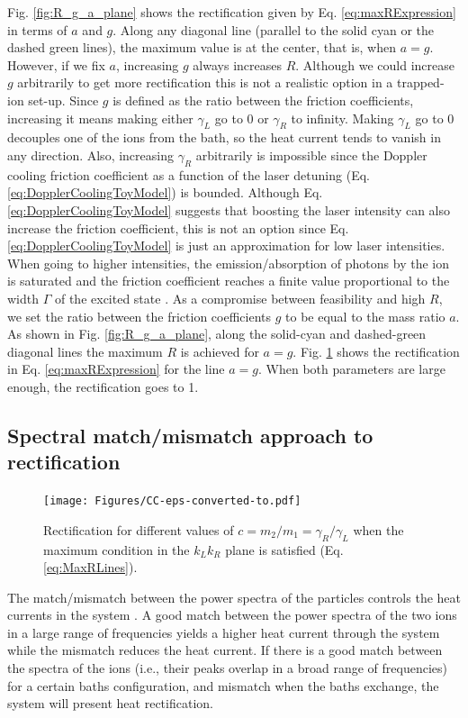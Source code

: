 Fig. \ref{fig:R_g_a_plane} shows the rectification given by Eq. \eqref{eq:maxRExpression} in terms of $a$ and $g$. Along any diagonal line (parallel to the solid cyan or the dashed green lines), the maximum value is at the center, that is, when $a = g$. However, if we fix $a$, increasing $g$ always increases $R$. Although we could increase $g$ arbitrarily to get more rectification this is not a realistic option in a trapped-ion set-up. Since $g$ is defined as the ratio between the friction coefficients, increasing it means making either $\gamma_L$ go to 0 or $\gamma_R$ to infinity. Making $\gamma_L$ go to 0 decouples one of the ions from the bath, so the heat current tends to vanish in any direction. Also, increasing $\gamma_R$ arbitrarily is impossible since the Doppler cooling friction coefficient as a function of the laser detuning (Eq. \eqref{eq:DopplerCoolingToyModel}) is bounded. Although Eq. \eqref{eq:DopplerCoolingToyModel} suggests that boosting the laser intensity can also increase the friction coefficient, this is not an option since Eq. \eqref{eq:DopplerCoolingToyModel} is just an approximation for low laser intensities. When going to higher intensities, the emission/absorption of photons by the ion is saturated and the friction coefficient reaches a finite value proportional to the width $\Gamma$ of the excited state \cite{Metcalf2003}. As a compromise between feasibility and high $R$, we set the ratio between the friction coefficients $g$ to be equal to the mass ratio $a$. As shown  in Fig. \ref{fig:R_g_a_plane}, along the solid-cyan and dashed-green diagonal lines the maximum $R$ is achieved for $a = g$. Fig. \ref{fig:Fig_PerfectRectification} shows the rectification in Eq. \eqref{eq:maxRExpression} for the line $a = g$. When both parameters are large enough, the rectification goes to 1.
%
%
\subsection{Spectral match/mismatch approach to rectification}
%
%
%
\begin{figure}
  \texttt{[image: Figures/CC-eps-converted-to.pdf]}
  \caption{Rectification for different values of $c=m_2/m_1=\gamma_R/\gamma_L$ when the maximum condition in the $k_L k_R$ plane is satisfied (Eq. \eqref{eq:MaxRLines}).}
  \label{fig:Fig_PerfectRectification}
\end{figure}

The match/mismatch between the power spectra of the particles controls the heat currents in the system \cite{Terraneo2002,Li2004}. A good match between the power spectra of the two ions in a large range of frequencies yields a higher heat current through the system while the mismatch  reduces the heat current.
If there is a good match between the spectra of the ions (i.e., their peaks overlap in a broad range of frequencies) for a certain baths configuration, and mismatch when the baths exchange, the system will present heat rectification.

